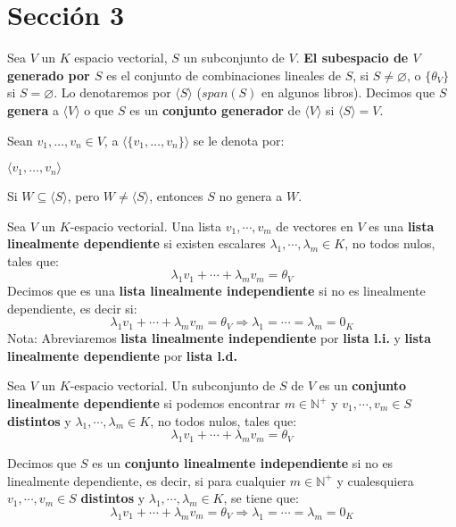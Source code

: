 \section{Sección 3}
\begin{definition}{}{}
    Sea $V$ un $K$ espacio vectorial, $S$ un subconjunto de $V$. \textbf{El subespacio de $V$ generado por $S$} es el conjunto de combinaciones lineales de $S$, si $S \neq \varnothing$, o $\{\theta_V\}$ si $S = \varnothing$. Lo denotaremos por $\langle S \rangle$ ($span(S)$ en algunos libros).
    Decimos que $S$ \textbf{genera} a $\langle V \rangle$ o que $S$ es un \textbf{conjunto generador} de $\langle V \rangle$ si $\langle S \rangle = V$.
\end{definition}
\begin{notation}{}{}
   Sean $v_1, \dots, v_n \in V$, a $\langle \{v_1, \dots, v_n\} \rangle$ se le denota por: 
    
    $\langle v_1, \dots, v_n \rangle $
\end{notation}
\begin{obs}{}{}
    Si $W \subseteq \langle S \rangle$, pero $W \neq \langle S \rangle$, entonces $S$ no genera a $W$.
\end{obs}
\begin{definition}{}{}
    Sea $V$ un $K$-espacio vectorial. Una lista $v_1, \cdots, v_m$ de vectores en $V$ es una \textbf{lista linealmente dependiente} si existen escalares $\lambda_1, \cdots, \lambda_m \in K$, no todos nulos, tales que:
    $$\lambda_1 v_1 + \cdots + \lambda_m v_m = \theta_V$$
    Decimos que es una \textbf{lista linealmente independiente} si no es linealmente dependiente, es decir si:
    $$\lambda_1 v_1 + \cdots + \lambda_m v_m = \theta_V \Rightarrow \lambda_1 = \cdots = \lambda_m = 0_K$$
    Nota: Abreviaremos \textbf{lista linealmente independiente} por \textbf{lista l.i.} y \textbf{lista linealmente dependiente} por \textbf{lista l.d.}
\end{definition}
\begin{definition}{}{}
    Sea $V$ un $K$-espacio vectorial. Un subconjunto de $S$ de $V$ es un \textbf{conjunto linealmente dependiente} si podemos encontrar $m \in \mathbb{N}^+$ y $v_1, \cdots, v_m \in S$ \textbf{distintos} y $\lambda_1, \cdots, \lambda_m \in K$, no todos nulos, tales que:
    $$\lambda_1 v_1 + \cdots + \lambda_m v_m = \theta_V$$

    Decimos que $S$ es un \textbf{conjunto linealmente independiente} si no es linealmente dependiente, es decir, si para cualquier $m \in \mathbb{N}^+$  y cualesquiera $v_1, \cdots, v_m \in S$ \textbf{distintos} y $\lambda_1, \cdots, \lambda_m \in K$, se tiene que:
    $$\lambda_1 v_1 + \cdots + \lambda_m v_m = \theta_V \Rightarrow \lambda_1 = \cdots = \lambda_m = 0_K$$
\end{definition}
